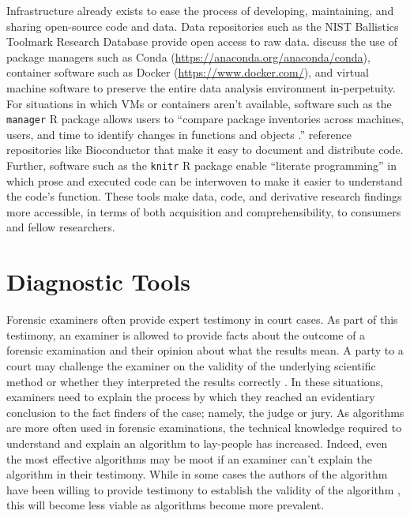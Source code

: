 \documentclass[11pt,]{isuthesis}
\begin{document}
Infrastructure already exists to ease the process of developing, maintaining, and sharing open-source code and data.
Data repositories such as the NIST Ballistics Toolmark Research Database \citep{Zheng2020} provide open access to raw data.
\citet{Grning2018} discuss the use of package managers such as Conda (\url{https://anaconda.org/anaconda/conda}), container software such as Docker (\url{https://www.docker.com/}), and virtual machine software to preserve the entire data analysis environment in-perpetuity.
For situations in which VMs or containers aren't available, software such as the \texttt{manager} R package allows users to ``compare package inventories across machines, users, and time to identify changes in functions and objects \citep{Rice2020}.''
\citet{Piccolo2016} reference repositories like Bioconductor \citep{Huber2015} that make it easy to document and distribute code.
Further, software such as the \texttt{knitr} R package \citep{Xie2014} enable ``literate programming'' in which prose and executed code can be interwoven to make it easier to understand the code's function.
These tools make data, code, and derivative research findings more accessible, in terms of both acquisition and comprehensibility, to consumers and fellow researchers.

\hypertarget{diagnostic-tools}{%
\section{Diagnostic Tools}\label{diagnostic-tools}}

Forensic examiners often provide expert testimony in court cases.
As part of this testimony, an examiner is allowed to provide facts about the outcome of a forensic examination and their opinion about what the results mean.
A party to a court may challenge the examiner on the validity of the underlying scientific method or whether they interpreted the results correctly \citep{aafsArticle}.
In these situations, examiners need to explain the process by which they reached an evidentiary conclusion to the fact finders of the case; namely, the judge or jury.
As algorithms are more often used in forensic examinations, the technical knowledge required to understand and explain an algorithm to lay-people has increased.
Indeed, even the most effective algorithms may be moot if an examiner can't explain the algorithm in their testimony.
While in some cases the authors of the algorithm have been willing to provide testimony to establish the validity of the algorithm \citep{trueAlleleTestimony}, this will become less viable as algorithms become more prevalent.
\end{document}
